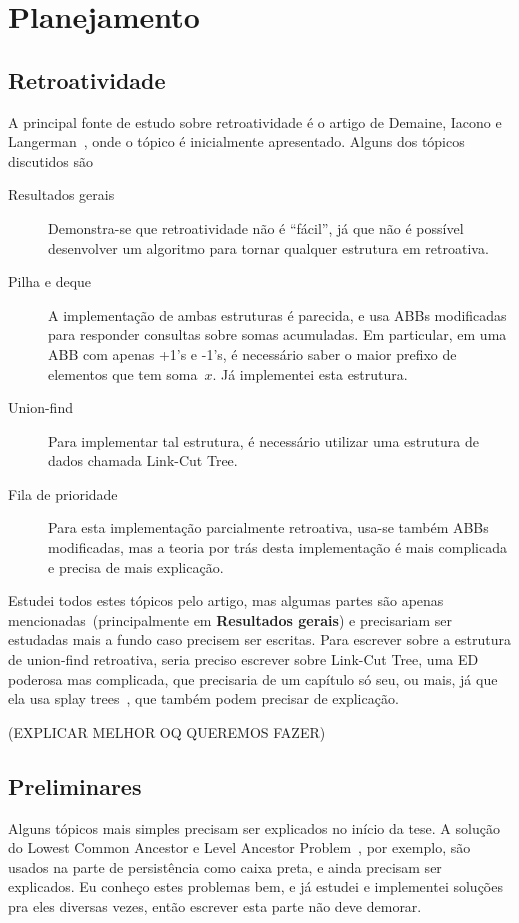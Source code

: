 \documentclass[quali.tex]{subfile}
\begin{document}
\section{Planejamento}

\subsection{Retroatividade}

A principal fonte de estudo sobre retroatividade é o artigo de Demaine, Iacono e Langerman~\cite{DemaineIL2007}, onde o tópico é inicialmente apresentado. Alguns dos tópicos discutidos são

\begin{description}
	\item[Resultados gerais] Demonstra-se que retroatividade não é ``fácil'', já que não é possível desenvolver um algoritmo para tornar qualquer estrutura em retroativa.
	\item[Pilha e deque] A implementação de ambas estruturas é parecida, e usa ABBs modificadas para responder consultas sobre somas acumuladas. Em particular, em uma ABB com apenas +1's e -1's, é necessário saber o maior prefixo de elementos que tem soma~$x$. Já implementei esta estrutura.
	\item[Union-find] Para implementar tal estrutura, é necessário utilizar uma estrutura de dados chamada Link-Cut Tree.
	\item[Fila de prioridade] Para esta implementação parcialmente retroativa, usa-se também ABBs modificadas, mas a teoria por trás desta implementação é mais complicada e precisa de mais explicação.
\end{description}

Estudei todos estes tópicos pelo artigo, mas algumas partes são apenas mencionadas~(principalmente em \textbf{Resultados gerais}) e precisariam ser estudadas mais a fundo caso precisem ser escritas. Para escrever sobre a estrutura de union-find retroativa, seria preciso escrever sobre Link-Cut Tree, uma ED poderosa mas complicada, que precisaria de um capítulo só seu, ou mais, já que ela usa splay trees~\cite{SleatorT1985}, que também podem precisar de explicação.

(EXPLICAR MELHOR OQ QUEREMOS FAZER) %

\subsection{Preliminares}

Alguns tópicos mais simples precisam ser explicados no início da tese. A solução do Lowest Common Ancestor e Level Ancestor Problem~\cite{BenderM-F2004, Myers83}, por exemplo, são usados na parte de persistência como caixa preta, e ainda precisam ser explicados. Eu conheço estes problemas bem, e já estudei e implementei soluções pra eles diversas vezes, então escrever esta parte não deve demorar.
\end{document}
